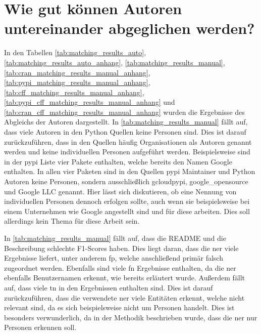 \section{Wie gut können Autoren untereinander abgeglichen werden?}
\label{sec:abgleich_diskussion}
In den Tabellen \ref{tab:matching_results_auto}, \ref{tab:matching_results_auto_anhang}, \ref{tab:matching_results_manual},\ref{tab:cran_matching_results_manual_anhang}, \ref{tab:pypi_matching_results_manual_anhang}, \ref{tab:cff_matching_results_manual_anhang}, \ref{tab:pypi_cff_matching_results_manual_anhang} und \ref{tab:cran_cff_matching_results_manual_anhang} wurden die Ergebnisse des Abgleichs der Autoren dargestellt.
In \autoref{tab:matching_results_manual} fällt auf, dass viele Autoren in den Python Quellen keine Personen sind.
Dies ist darauf zurückzuführen, dass in den Quellen häufig Organisationen als Autoren genannt werden und keine individuellen Personen aufgeführt werden.
Beispielsweise sind in der \gls{pypi} Liste vier Pakete enthalten, welche bereits den Namen Google enthalten.
In allen vier Paketen sind in den Quellen \gls{pypi} Maintainer und Python Autoren keine Personen, sondern ausschließlich \glqq gcloudpypi\grqq{}, \glqq google\_opensource\grqq{} und \glqq Google LLC\grqq{} genannt.
Hier lässt sich diskutieren, ob eine Nennung von individuellen Personen dennoch erfolgen sollte, auch wenn sie beispielsweise bei einem Unternehmen wie Google angestellt sind und für diese arbeiten.
Dies soll allerdings kein Thema für diese Arbeit sein.

In \autoref{tab:matching_results_manual} fällt auf, dass die README und die Beschreibung schlechte F1-Scores haben.
Dies liegt daran, dass die \gls{ner} viele Ergebnisse liefert, unter anderem \gls{fp}, welche anschließend primär falsch zugeordnet werden.
Ebenfalls sind viele \gls{fn} Ergebnisse enthalten, da die \gls{ner} ebenfalls Benutzernamen erkennt, wie bereits erläutert wurde.
Außerdem fällt auf, dass viele \gls{tn} in den Ergebnissen enthalten sind.
Dies ist darauf zurückzuführen, dass die verwendete \gls{ner} viele Entitäten erkennt, welche nicht relevant sind, da es sich beispielsweise nicht um Personen handelt.
Dies ist besonders verwunderlich, da in der Methodik beschrieben wurde, dass die \gls{ner} nur Personen erkennen soll.

